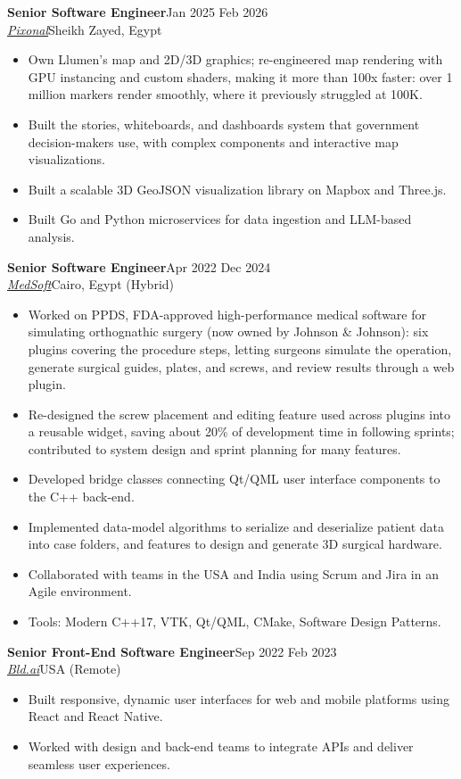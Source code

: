 \documentclass[10pt,a4paper]{article}
\newcommand{\job}[4]{%
  \vspace{4pt}\textbf{#1}\hfill #4\\
  \textit{#2}\hfill #3\par\vspace{1pt}}
\begin{document}
\job{Senior Software Engineer}{\href{https://www.pixonal.com/}{Pixonal}}{Sheikh Zayed, Egypt}{Jan 2025 \textendash{} Feb 2026}
\begin{itemize}
  \item Own Llumen's map and 2D/3D graphics; re-engineered map rendering with GPU instancing and custom shaders,
        making it more than 100x faster: over 1 million markers render smoothly, where it previously struggled at 100K.
  \item Built the stories, whiteboards, and dashboards system that government decision-makers use, with complex
        components and interactive map visualizations.
  \item Built a scalable 3D GeoJSON visualization library on Mapbox and Three.js.
  \item Built Go and Python microservices for data ingestion and LLM-based analysis.
\end{itemize}

\job{Senior Software Engineer}{\href{https://medsft.com/}{MedSoft}}{Cairo, Egypt (Hybrid)}{Apr 2022 \textendash{} Dec 2024}
\begin{itemize}
  \item Worked on PPDS, FDA-approved high-performance medical software for simulating orthognathic surgery (now owned by
        Johnson \& Johnson): six plugins covering the procedure steps, letting surgeons simulate the operation, generate
        surgical guides, plates, and screws, and review results through a web plugin.
  \item Re-designed the screw placement and editing feature used across plugins into a reusable widget, saving about
        20\% of development time in following sprints; contributed to system design and sprint planning for many features.
  \item Developed bridge classes connecting Qt/QML user interface components to the C++ back-end.
  \item Implemented data-model algorithms to serialize and deserialize patient data into case folders, and features to
        design and generate 3D surgical hardware.
  \item Collaborated with teams in the USA and India using Scrum and Jira in an Agile environment.
  \item Tools: Modern C++17, VTK, Qt/QML, CMake, Software Design Patterns.
\end{itemize}

\job{Senior Front-End Software Engineer}{\href{https://www.bld.ai/}{Bld.ai}}{USA (Remote)}{Sep 2022 \textendash{} Feb 2023}
\begin{itemize}
  \item Built responsive, dynamic user interfaces for web and mobile platforms using React and React Native.
  \item Worked with design and back-end teams to integrate APIs and deliver seamless user experiences.
\end{itemize}
\end{document}
